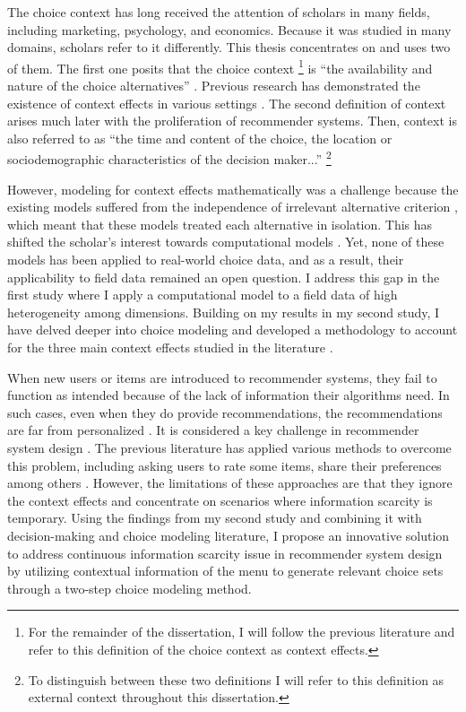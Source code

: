 \documentclass[a4paper,12pt]{article}
\begin{document}
The choice context has long received the attention of scholars in many fields, including marketing, psychology, and economics. Because it was studied in many domains, scholars refer to it differently. This thesis concentrates on and uses two of them. The first one posits that the choice context \footnote{For the remainder of the dissertation, I will follow the previous literature \citep{truebloodEtAl13} and refer to this definition of the choice context as context effects.} is ``the availability and nature of the choice alternatives'' \citep{tversky1972elimination, huberEtAl82, simonson89}. Previous research has demonstrated the existence of context effects in various settings \citep{herne1997decoy, soltani2012range, evangelidisEtAl18,  wuConsguner20}. The second definition of context arises much later with the proliferation of recommender systems. Then, context is also referred to as ``the time and content of the choice, the location or sociodemographic characteristics of the decision maker...'' \citep{adomavicius2011context}\footnote{To distinguish between these two definitions I will refer to this definition as external context throughout this dissertation.}

However, modeling for context effects mathematically was a challenge because the existing models suffered from the independence of irrelevant alternative criterion \citep{luce59}, which meant that these models treated each alternative in isolation. This has shifted the scholar's interest towards computational models \citep{usher2001time, roe2001multialternative, trueblood2014multiattribute, noguchi2018multialternative}. Yet, none of these models has been applied to real-world choice data, and as a result, their applicability to field data remained an open question. I address this gap in the first study where I apply a computational model to a field data of high heterogeneity among dimensions. Building on my results in my second study, I have delved deeper into choice modeling and developed a methodology to account for the three main context effects studied in the literature \citep{truebloodEtAl13}. 

When new users or items are introduced to recommender systems, they fail to function as intended because of the lack of information their algorithms need. In such cases, even when they do provide recommendations, the recommendations are far from personalized \citep{lika2014facing}. It is considered a key challenge in recommender system design \citep{park2009pairwise}. The previous literature has applied various methods to overcome this problem, including asking users to rate some items, share their preferences among others \citep{guy2009personalized, aharon2013off, bykau2013coping, saveski2014item}. However, the limitations of these approaches are that they ignore the context effects and concentrate on scenarios where information scarcity is temporary. Using the findings from my second study and combining it with decision-making and choice modeling literature, I propose an innovative solution to address continuous information scarcity issue in recommender system design by utilizing contextual information of the menu to generate relevant choice sets through a two-step choice modeling method.
\end{document}
